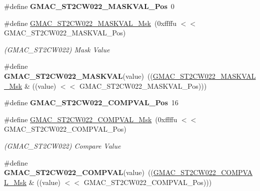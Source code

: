 \begin{DoxyCompactItemize}
\#define {\bfseries G\+M\+A\+C\+\_\+\+S\+T2\+C\+W022\+\_\+\+M\+A\+S\+K\+V\+A\+L\+\_\+\+Pos}~0
\item 
\mbox{\label{group__SAME70__GMAC_ga483540a569c252160704b469f4d54664}} 
\#define \mbox{\hyperlink{group__SAME70__GMAC_ga483540a569c252160704b469f4d54664}{G\+M\+A\+C\+\_\+\+S\+T2\+C\+W022\+\_\+\+M\+A\+S\+K\+V\+A\+L\+\_\+\+Msk}}~(0xffffu $<$$<$ G\+M\+A\+C\+\_\+\+S\+T2\+C\+W022\+\_\+\+M\+A\+S\+K\+V\+A\+L\+\_\+\+Pos)
\begin{DoxyCompactList}\small\item\em (G\+M\+A\+C\+\_\+\+S\+T2\+C\+W022) Mask Value \end{DoxyCompactList}\item 
\mbox{\label{group__SAME70__GMAC_gad0af582cb94b5b3909c7d8ee082fc158}} 
\#define {\bfseries G\+M\+A\+C\+\_\+\+S\+T2\+C\+W022\+\_\+\+M\+A\+S\+K\+V\+AL}(value)~((\mbox{\hyperlink{group__SAMV71__GMAC_ga483540a569c252160704b469f4d54664}{G\+M\+A\+C\+\_\+\+S\+T2\+C\+W022\+\_\+\+M\+A\+S\+K\+V\+A\+L\+\_\+\+Msk}} \& ((value) $<$$<$ G\+M\+A\+C\+\_\+\+S\+T2\+C\+W022\+\_\+\+M\+A\+S\+K\+V\+A\+L\+\_\+\+Pos)))
\item 
\mbox{\label{group__SAME70__GMAC_gac90e7cf72adf38ef5050322d13047e0d}} 
\#define {\bfseries G\+M\+A\+C\+\_\+\+S\+T2\+C\+W022\+\_\+\+C\+O\+M\+P\+V\+A\+L\+\_\+\+Pos}~16
\item 
\mbox{\label{group__SAME70__GMAC_ga4c74c9dc959b2e3f5a7d2ed89e91d6ed}} 
\#define \mbox{\hyperlink{group__SAME70__GMAC_ga4c74c9dc959b2e3f5a7d2ed89e91d6ed}{G\+M\+A\+C\+\_\+\+S\+T2\+C\+W022\+\_\+\+C\+O\+M\+P\+V\+A\+L\+\_\+\+Msk}}~(0xffffu $<$$<$ G\+M\+A\+C\+\_\+\+S\+T2\+C\+W022\+\_\+\+C\+O\+M\+P\+V\+A\+L\+\_\+\+Pos)
\begin{DoxyCompactList}\small\item\em (G\+M\+A\+C\+\_\+\+S\+T2\+C\+W022) Compare Value \end{DoxyCompactList}\item 
\mbox{\label{group__SAME70__GMAC_gae31c91f69e668837032c452c9984e29e}} 
\#define {\bfseries G\+M\+A\+C\+\_\+\+S\+T2\+C\+W022\+\_\+\+C\+O\+M\+P\+V\+AL}(value)~((\mbox{\hyperlink{group__SAMV71__GMAC_ga4c74c9dc959b2e3f5a7d2ed89e91d6ed}{G\+M\+A\+C\+\_\+\+S\+T2\+C\+W022\+\_\+\+C\+O\+M\+P\+V\+A\+L\+\_\+\+Msk}} \& ((value) $<$$<$ G\+M\+A\+C\+\_\+\+S\+T2\+C\+W022\+\_\+\+C\+O\+M\+P\+V\+A\+L\+\_\+\+Pos)))

\end{DoxyCompactItemize}
